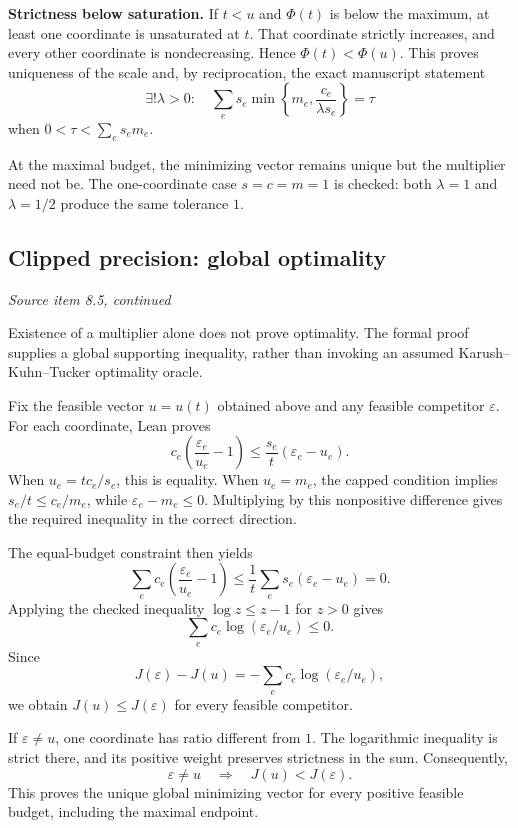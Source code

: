 \textbf{Strictness below saturation.} If $t<u$ and $\Phi(t)$ is below the maximum, at least one coordinate is unsaturated at $t$. That coordinate strictly increases, and every other coordinate is nondecreasing. Hence $\Phi(t)<\Phi(u)$. This proves uniqueness of the scale and, by reciprocation, the exact manuscript statement
\[
\boxed{\exists!\lambda>0:\quad
\sum_e s_e\min\!\left\{m_e,\frac{c_e}{\lambda s_e}\right\}=\tau}
\]
when $0<\tau<\sum_es_em_e$.

At the maximal budget, the minimizing vector remains unique but the multiplier need not be. The one-coordinate case $s=c=m=1$ is checked: both $\lambda=1$ and $\lambda=1/2$ produce the same tolerance $1$.



\subsection{Clipped precision: global optimality}\label{supp4:subsection:006}\textit{Source item 8.5, continued}\par
Existence of a multiplier alone does not prove optimality. The formal proof supplies a global supporting inequality, rather than invoking an assumed Karush--Kuhn--Tucker optimality oracle.

Fix the feasible vector $u=u(t)$ obtained above and any feasible competitor $\varepsilon$. For each coordinate, Lean proves
\[
\boxed{
 c_e\left(\frac{\varepsilon_e}{u_e}-1\right)
 \le \frac{s_e}{t}(\varepsilon_e-u_e).
}
\]
When $u_e=tc_e/s_e$, this is equality. When $u_e=m_e$, the capped condition implies $s_e/t\le c_e/m_e$, while $\varepsilon_e-m_e\le0$. Multiplying by this nonpositive difference gives the required inequality in the correct direction.

The equal-budget constraint then yields
\[
\sum_e c_e\left(\frac{\varepsilon_e}{u_e}-1\right)
\le\frac1t\sum_e s_e(\varepsilon_e-u_e)=0.
\]
Applying the checked inequality $\log z\le z-1$ for $z>0$ gives
\[
\sum_e c_e\log(\varepsilon_e/u_e)\le0.
\]
Since
\[
J(\varepsilon)-J(u)
=-\sum_e c_e\log(\varepsilon_e/u_e),
\]
we obtain $J(u)\le J(\varepsilon)$ for every feasible competitor.

If $\varepsilon\ne u$, one coordinate has ratio different from $1$. The logarithmic inequality is strict there, and its positive weight preserves strictness in the sum. Consequently,
\[
\boxed{\varepsilon\ne u\quad\Longrightarrow\quad J(u)<J(\varepsilon).}
\]
This proves the unique global minimizing vector for every positive feasible budget, including the maximal endpoint.

